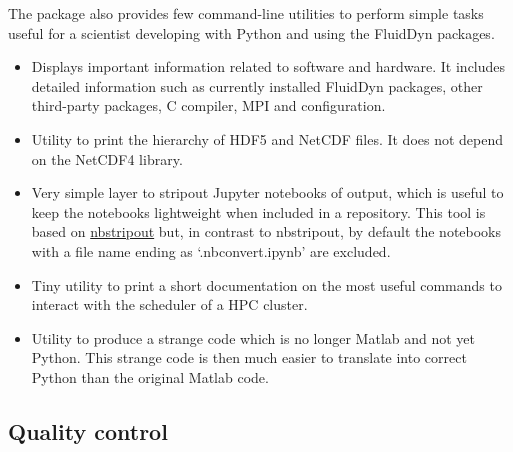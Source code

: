 The package \fluiddyn also provides few command-line utilities to perform
simple tasks useful for a scientist developing with Python and using the
FluidDyn packages.
\begin{itemize}

\item {}

Displays important information related to software and hardware. It
includes detailed information such as currently installed FluidDyn packages,
other third-party packages, C compiler, MPI and \Numpy configuration.

\item {}

Utility to print the hierarchy of HDF5 and NetCDF files. It does not depend on
the NetCDF4 library.

\item {}

Very simple layer to stripout Jupyter notebooks of output, which is useful to
keep the notebooks lightweight when included in a repository.
%
This tool is based on \href{https://github.com/kynan/nbstripout}{nbstripout}
but, in contrast to nbstripout,
%
by default the notebooks with a file name ending as `.nbconvert.ipynb' are
excluded.

\item {}

Tiny utility to print a short documentation on the most useful commands to
interact with the scheduler of a HPC cluster.

\item {}

Utility to produce a strange code which is no longer Matlab and not yet Python.
%
This strange code is then much easier to translate into correct Python than the
original Matlab code.

\end{itemize}


\subsection{Quality control}


